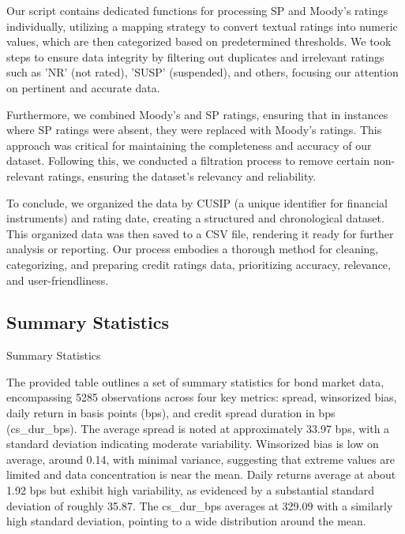 \documentclass[12pt]{article}
\newcommand*{\PathToOutput}{../output}%
\begin{document}
Our script contains dedicated functions for processing SP and Moody's ratings individually, utilizing a mapping strategy to convert textual ratings into numeric values, which are then categorized based on predetermined thresholds. We took steps to ensure data integrity by filtering out duplicates and irrelevant ratings such as 'NR' (not rated), 'SUSP' (suspended), and others, focusing our attention on pertinent and accurate data.

Furthermore, we combined Moody's and SP ratings, ensuring that in instances where SP ratings were absent, they were replaced with Moody's ratings. This approach was critical for maintaining the completeness and accuracy of our dataset. Following this, we conducted a filtration process to remove certain non-relevant ratings, ensuring the dataset's relevancy and reliability.

To conclude, we organized the data by CUSIP (a unique identifier for financial instruments) and rating date, creating a structured and chronological dataset. This organized data was then saved to a CSV file, rendering it ready for further analysis or reporting. Our process embodies a thorough method for cleaning, categorizing, and preparing credit ratings data, prioritizing accuracy, relevance, and user-friendliness.

\subsection{Summary Statistics}
\begin{table}[ht]
\centering

\caption{Summary Statistics}
\label{tab:summary_stats}
\end{table}
\newline
\newline
The provided table outlines a set of summary statistics for bond market data, encompassing 5285 observations across four key metrics: spread, winsorized bias, daily return in basis points (bps), and credit spread duration in bps (cs\_dur\_bps). The average spread is noted at approximately 33.97 bps, with a standard deviation indicating moderate variability. Winsorized bias is low on average, around 0.14, with minimal variance, suggesting that extreme values are limited and data concentration is near the mean. Daily returns average at about 1.92 bps but exhibit high variability, as evidenced by a substantial standard deviation of roughly 35.87. The cs\_dur\_bps averages at 329.09 with a similarly high standard deviation, pointing to a wide distribution around the mean.
\end{document}
